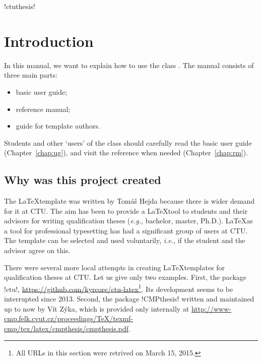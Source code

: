 \documentclass[twoside]{ctuthesis}
\theoremstyle{plain}
\theoremstyle{definition}
\theoremstyle{note}
\begin{document}
\renewcommand \ctulstsep {0pt}

\newcommand\ctuclsname{\leavevmode\unhcopy\ctuclsnamebox}
\newsavebox\ctuclsnamebox
\begin{lrbox}{\ctuclsnamebox}
\ctulst!ctuthesis!
\end{lrbox}

\maketitle

\chapter{Introduction}






In this manual, we want to explain how to use the class \ctuclsname.
The manual consists of three main parts:

\begin{itemize}
\item basic user guide;
\item reference manual;
\item guide for template authors.
\end{itemize}

Students and other `users' of the class should carefully read the basic user guide (Chapter~\ref{chap:ug}),
 and visit the reference when needed (Chapter~\ref{chap:rm}).




\section*{Why was this project created}

The \ctuclsname\@ \LaTeX\@ template was written by Tomáš Hejda because there is wider demand for it at CTU. The aim has been to provide a \LaTeX\@ tool to students and their advisors for writing qualification theses (\emph{e.g.}, bachelor, master, Ph.D.). \LaTeX\@ as a tool for professional typesetting has had a significant group of users at CTU. The \ctuclsname\@ template can be selected and used voluntarily, \emph{i.e.}, if the student and the advisor agree on this.

There were several more local attempts in creating \LaTeX\@ templates for qualification theses at CTU. Let us give only two examples. First, the package \ctulst!ctu!, \url{https://github.com/kyrcore/ctu-latex}\footnote{All URLs in this section were retrived on March 15, 2015.}. Its development seems to be interrupted since 2013. Second, the package \ctulst!CMPthesis! written and maintained up to now by Vít Zýka, which is provided only internally at \url{http://www-cmp.felk.cvut.cz/proceedings/TeX/texmf-cmp/tex/latex/cmpthesis/cmpthesis.pdf}.
\end{document}
